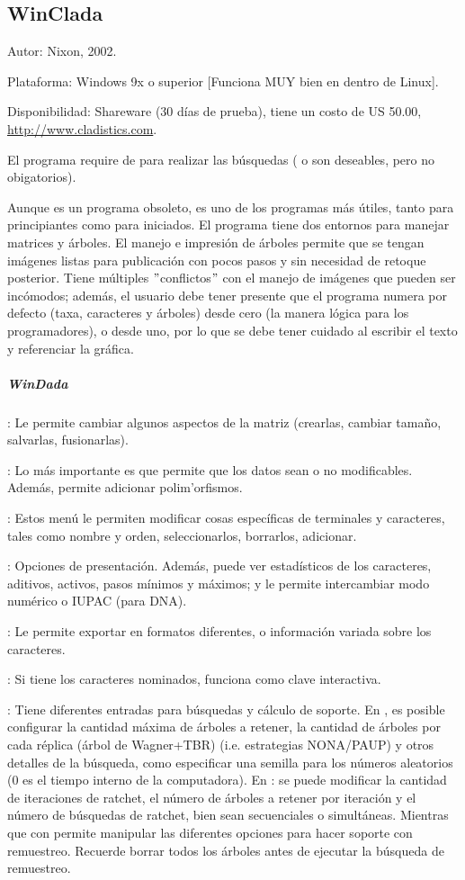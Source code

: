 \subsection{WinClada}
\noindent
Autor: Nixon, 2002.

Plataforma: Windows 9x o superior [Funciona MUY bien en  dentro de Linux].

Disponibilidad: Shareware (30 d\'ias de prueba), tiene un costo de US 50.00, 
\url{http://www.cladistics.com}.

El programa require de  para realizar las b\'usquedas ( o  son deseables, pero no obigatorios).

Aunque es un programa obsoleto, es uno de los programas m\'as \'utiles, tanto para principiantes como para iniciados. El programa tiene dos entornos para manejar matrices y \'arboles. El manejo e impresi\'on de \'arboles permite que se tengan im\'agenes listas para publicaci\'on con pocos pasos y sin necesidad de retoque posterior. Tiene m\'ultiples $"$conflictos$"$ con el manejo de im\'agenes que pueden ser inc\'omodos; adem\'as, el usuario debe tener presente que el programa numera por defecto (taxa, caracteres y \'arboles) desde cero (la manera l\'ogica para los programadores), o desde uno, por lo que se debe tener cuidado al escribir el texto y referenciar la gr\'afica.

\subparagraph*{WinDada}
: Le permite cambiar algunos aspectos de la matriz (crearlas, cambiar tama\~no, salvarlas, fusionarlas).

: Lo m\'as importante es que permite que los datos sean o no modificables. Adem\'as, permite adicionar polim'orfismos.

: Estos men\'u le permiten modificar cosas espec\'ificas de terminales y caracteres, tales como nombre y orden, seleccionarlos, borrarlos, adicionar.

: Opciones de presentaci\'on. Adem\'as, puede ver estad\'isticos de los caracteres, aditivos, activos, pasos m\'inimos y m\'aximos; y le permite intercambiar modo num\'erico o IUPAC (para DNA).

: Le permite exportar en formatos diferentes, o informaci\'on variada sobre los caracteres.

: Si tiene los caracteres nominados, funciona como clave interactiva.

: Tiene diferentes entradas para b\'usquedas y c\'alculo de soporte. En , es posible configurar la cantidad m\'axima de \'arboles a retener, la cantidad de \'arboles por cada r\'eplica (\'arbol de Wagner+TBR) (i.e. estrategias NONA/PAUP) y otros detalles de la b\'usqueda, como especificar una semilla para los n\'umeros aleatorios (0 es el tiempo interno de la computadora). En : se puede modificar la cantidad de iteraciones de ratchet, el n\'umero de \'arboles a retener por iteraci\'on y el n\'umero de b\'usquedas de ratchet, bien sean secuenciales o simult\'aneas. Mientras que con  permite manipular las diferentes opciones para hacer soporte con remuestreo. Recuerde borrar todos los \'arboles antes de ejecutar la b\'usqueda de remuestreo.


